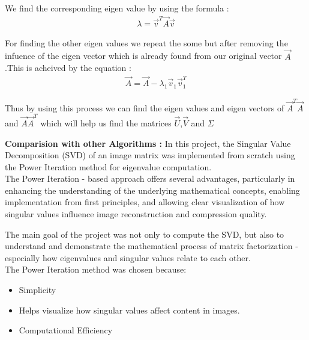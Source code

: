 \documentclass[journal]{IEEEtran}
\begin{document}
We find the corresponding eigen value by using the formula :
\begin{align*}
    \lambda = \vec{v}^T\vec{A}\vec{v}
\end{align*}

For finding the other eigen values we repeat the some but after removing the infuence of the eigen vector which is already found from our original vector $\vec{A}$ .This is acheived by the equation :
\begin{align*}
    \vec{A} = \vec{A} - \lambda_1\vec{v}_1\vec{v}_1^T
\end{align*}

Thus by using this process we can find the eigen values and eigen vectors of  $\vec{A}^T\vec{A}$ and $\vec{A}\vec{A}^T$ which will help us find the matrices $\vec{U}$,$\vec{V}$ and $\Sigma$

\newpage

\textbf{Comparision with other Algorithms :}
\vspace{1em} \newline
In this project, the Singular Value Decomposition (SVD) of an image matrix was implemented from scratch using the Power Iteration method for eigenvalue computation. \\The Power Iteration - based approach offers several advantages, particularly in enhancing the understanding of the underlying mathematical concepts, enabling implementation from first principles, and allowing clear visualization of how singular values influence image reconstruction and compression quality.
\vspace{1em} \newline
\begin{table}[h!]    
      \centering
      
      \caption{}
      \label{}
    \end{table}


The main goal of the project was not only to compute the SVD, but also to understand and demonstrate the mathematical process of matrix factorization  - especially how eigenvalues and singular values relate to each other.\\

The Power Iteration method was chosen because:
\begin{itemize}
    \item Simplicity
    \item Helps visualize how singular values affect  content in images.
    \item Computational Efficiency 

\end{itemize}
\end{document}
